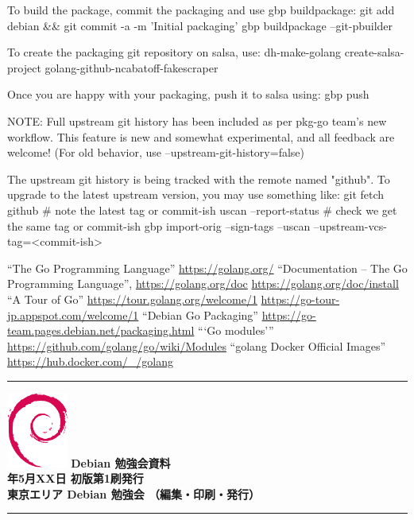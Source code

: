 \documentclass[mingoth,a4paper]{jsarticle}
\newcommand{\debmtgyear}{2021}
\newcommand{\debmtgmonth}{5}
\newcommand{\debmtgdate}{XX}
\begin{document}
\begin{commandline}
To build the package, commit the packaging and use gbp buildpackage:
    git add debian && git commit -a -m 'Initial packaging'
    gbp buildpackage --git-pbuilder

To create the packaging git repository on salsa, use:
    dh-make-golang create-salsa-project golang-github-ncabatoff-fakescraper

Once you are happy with your packaging, push it to salsa using:
    gbp push

NOTE: Full upstream git history has been included as per pkg-go team's
      new workflow.  This feature is new and somewhat experimental,
      and all feedback are welcome!
      (For old behavior, use --upstream-git-history=false)

The upstream git history is being tracked with the remote named "github".
To upgrade to the latest upstream version, you may use something like:
    git fetch github          # note the latest tag or commit-ish
    uscan --report-status     # check we get the same tag or commit-ish
    gbp import-orig --sign-tags --uscan --upstream-vcs-tag=<commit-ish>
 
\end{commandline}

\begin{thebibliography}{1}
  ``The Go Programming Language'' \url{https://golang.org/}
  ``Documentation -- The Go Programming Language'', \url{https://golang.org/doc}
  \url{https://golang.org/doc/install}
  ``A Tour of Go'' \url{https://tour.golang.org/welcome/1}
  \url{https://go-tour-jp.appspot.com/welcome/1}
  ``Debian Go Packaging'' \url{https://go-team.pages.debian.net/packaging.html}
  ```Go modules''' \url{https://github.com/golang/go/wiki/Modules}
  ``golang Docker Official Images'' \url{https://hub.docker.com/_/golang}
\end{thebibliography}



\mbox{}\newpage
\mbox{}\newpage

\vspace*{15cm}
\hrule
\vspace{2mm}
\includegraphics[width=2cm]{image-assets/openlogo-nd.eps}
\noindent \Large \bf Debian 勉強会資料\\
\noindent \normalfont \debmtgyear{}年\debmtgmonth{}月\debmtgdate{}日 \hspace{5mm}  初版第1刷発行\\
\noindent \normalfont 東京エリア Debian 勉強会 （編集・印刷・発行）\\
\hrule
\end{document}
